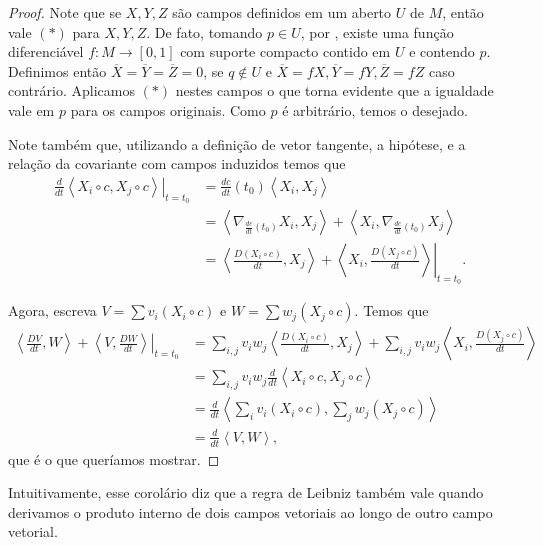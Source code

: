 \begin{corollary}
\begin{proof}
        Note que se $X,Y,Z$ são campos definidos em um aberto $U$ de $M$, então vale $(*)$ para $X,Y,Z$. De fato, tomando $p \in U$, por , existe uma função diferenciável $f:M\to [0,1]$ com suporte compacto contido em $U$ e contendo $p$. Definimos então $\overline{X} =\overline{Y} =\overline{Z}=0$, se $q \not\in U$ e $\overline{X}=fX, \overline{Y}=fY, \overline{Z}=fZ$ caso contrário. Aplicamos $(*)$ nestes campos o que torna evidente que a igualdade vale em $p$ para os campos originais. Como $p$ é arbitrário, temos o desejado.

        Note também que, utilizando a definição de vetor tangente, a hipótese, e a relação da covariante com campos induzidos temos que
        \begin{align*}
            \left.\frac{d}{dt}\left<X_{i} \circ  c,X_{j} \circ  c\right>\right|_{t=t_{0}} & = \frac{dc}{dt}(t_{0})\left<X_{i},X_{j}\right>                                                                                \\
                                                                                          & = \left<\nabla_{\frac{dc}{dt}(t_{0})}X_{i},X_{j}\right> + \left<X_{i},\nabla_{\frac{dc}{dt}(t_{0})}X_{j}\right>               \\
                                                                                          & = \left.\left<\frac{D(X_{i} \circ  c)}{dt},X_{j}\right> + \left<X_{i},\frac{D(X_{j} \circ  c)}{dt}\right>  \right|_{t=t_{0}}.
        \end{align*}

        Agora, escreva $V=\sum v_{i}(X_{i}\circ c)$ e $W=\sum w_{j}(X_{j} \circ c)$. Temos que
        \begin{align*}
            \left.\left<\frac{DV}{dt},W\right> +\left<V,\frac{DW}{dt}\right> \right|_{t=t_{0}} & = \sum_{i,j}v_{i}w_{j}\left<\frac{D(X_{i} \circ  c)}{dt},X_{j}\right> + \sum_{i,j}v_{i}w_{j}\left<X_{i},\frac{D(X_{j} \circ  c)}{dt}\right> \\
                                                                                               & =\sum_{i,j}v_{i}w_{j}\frac{d}{dt}\left<X_{i} \circ  c,X_{j} \circ  c\right>                                                                 \\
                                                                                               & =\frac{d}{dt}\left<\sum_{i}v_{i}(X_{i} \circ  c),\sum_{j}w_{j}(X_{j} \circ  c)\right>                                                       \\
                                                                                               & =\frac{d}{dt}\left<V,W\right>,
        \end{align*}
        que é o que queríamos mostrar.
    \end{proof}
\end{corollary}
Intuitivamente, esse corolário diz que a regra de Leibniz também vale quando derivamos o produto interno de dois campos vetoriais ao longo de outro campo vetorial.

